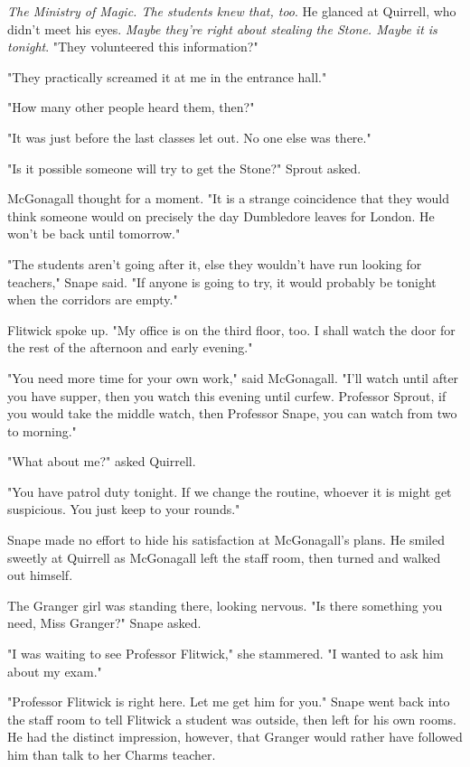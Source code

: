 \emph{The Ministry of Magic. The students knew that, too}. He glanced at Quirrell, who didn't meet his eyes. \emph{Maybe they're right about stealing the Stone. Maybe it is tonight}. "They volunteered this information?"

"They practically screamed it at me in the entrance hall."

"How many other people heard them, then?"

"It was just before the last classes let out. No one else was there."

"Is it possible someone will try to get the Stone?" Sprout asked.

McGonagall thought for a moment. "It is a strange coincidence that they would think someone would on precisely the day Dumbledore leaves for London. He won't be back until tomorrow."

"The students aren't going after it, else they wouldn't have run looking for teachers," Snape said. "If anyone is going to try, it would probably be tonight when the corridors are empty."

Flitwick spoke up. "My office is on the third floor, too. I shall watch the door for the rest of the afternoon and early evening."

"You need more time for your own work," said McGonagall. "I'll watch until after you have supper, then you watch this evening until curfew. Professor Sprout, if you would take the middle watch, then Professor Snape, you can watch from two to morning."

"What about me?" asked Quirrell.

"You have patrol duty tonight. If we change the routine, whoever it is might get suspicious. You just keep to your rounds."

Snape made no effort to hide his satisfaction at McGonagall's plans. He smiled sweetly at Quirrell as McGonagall left the staff room, then turned and walked out himself.

The Granger girl was standing there, looking nervous. "Is there something you need, Miss Granger?" Snape asked.

"I was waiting to see Professor Flitwick," she stammered. "I wanted to ask him about my exam."

"Professor Flitwick is right here. Let me get him for you." Snape went back into the staff room to tell Flitwick a student was outside, then left for his own rooms. He had the distinct impression, however, that Granger would rather have followed him than talk to her Charms teacher.

